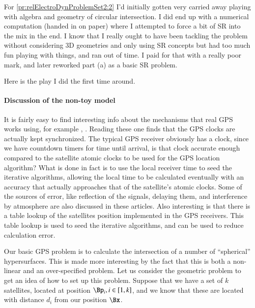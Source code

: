 %
%

For \cref{pr:relElectroDynProblemSet2:2} I'd initially gotten very carried away playing with algebra and geometry of circular intersection.
I did end up with a numerical computation (handed in on paper) where I attempted to force a bit of SR into the mix in the end.
I know that I really ought to have been tackling the problem without considering 3D geometries and only using SR concepts but had too much fun playing with things, and ran out of time.
I paid for that with a really poor mark, and later reworked part (a) as a basic SR problem.

Here is the play I did the first time around.

\paragraph{Discussion of the non-toy model}

It is fairly easy to find interesting info about the mechanisms that real GPS works using, for example
\citep{nasaGPS},
\citep{howStuffWorksGPS}.
Reading these one finds that the GPS clocks are actually kept synchronized.  The typical GPS receiver obviously has a clock, since we have countdown timers for time until arrival, is that clock accurate enough compared to the satellite atomic clocks to be used for the GPS location algorithm?  What is done in fact is to use the local receiver time to seed the iterative algorithms, allowing the local time to be calculated eventually with an accuracy that actually approaches that of the satellite's atomic clocks.  Some of the sources of error, like reflection of the signals, delaying them, and interference by atmosphere are also discussed in these articles.  Also interesting is that there is a table lookup of the satellites position implemented in the GPS receivers.  This table lookup is used to seed the iterative algorithms, and can be used to reduce calculation error.

Our basic GPS problem is to calculate the intersection of a number of ``spherical'' hypersurfaces.  This is made more interesting by the fact that this is both a non-linear and an over-specified problem.  Let us consider the geometric problem to get an idea of how to set up this problem.  Suppose that we have a set of \(k\) satellites, located at position \(\Bp_i, i \in [1,k]\), and we know that these are located with distance \(d_i\) from our position \(\Bx\).

